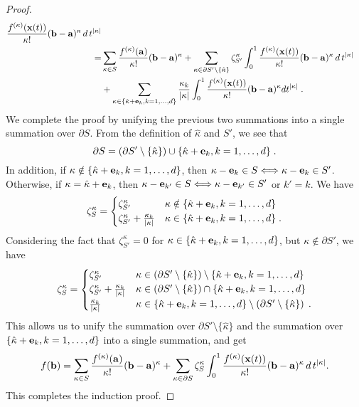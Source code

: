 \begin{proof}
\[\begin{split}
        \frac{f^{(\kappa)}(\mathbf{x}(t))}{\kappa!} (\mathbf{b}-\mathbf{a})^\kappa \,d\,t^{|\kappa|} \\
      =& \sum_{\kappa\in S} \frac{f^{(\kappa)}(\mathbf{a})}{\kappa!} (\mathbf{b}-\mathbf{a})^\kappa
      + \sum_{\kappa\in \partial S' \setminus \{{\hat\kappa}\}}
        \zeta^\kappa_{S'} \int_0^1
        \frac{f^{(\kappa)}(\mathbf{x}(t))}{\kappa!} (\mathbf{b}-\mathbf{a})^\kappa \,d\,t^{|\kappa|} \\
     &+ \sum_{\kappa\in \{{\hat\kappa}+\mathbf{e}_k,k=1,\ldots,d\}}
        \frac{\kappa_k}{|\kappa|} \int_0^1
        \frac{f^{(\kappa)}(\mathbf{x}(t))} {\kappa!} (\mathbf{b}-\mathbf{a})^{\kappa} dt^{|\kappa|}\;.
\end{split}\]
We complete the proof by unifying the previous two summations into
a single summation over $\partial S$.
From the definition of $\hat\kappa$ and $S'$, we see that
\[ \partial S = \left( \partial S' \setminus \{\hat\kappa\} \right)
                \cup \{ {\hat\kappa}+\mathbf{e}_k, k=1,\ldots,d \} \;.\]
In addition, if $\kappa \notin \{ {\hat\kappa}+\mathbf{e}_k, k=1,\ldots,d \}$, then
$\kappa-\mathbf{e}_k\in S \Longleftrightarrow \kappa-\mathbf{e}_k\in S'$.
Otherwise, if $\kappa = {\hat\kappa}+\mathbf{e}_k$,
then $\kappa-\mathbf{e}_{k'}\in S \Longleftrightarrow \kappa-\mathbf{e}_{k'}\in S'$ or $k'=k$.
We have
\[ \zeta^\kappa_S = \begin{cases}
   \zeta^\kappa_{S'} & \kappa \notin \{ {\hat\kappa}+\mathbf{e}_k, k=1,\ldots,d \} \\
   \zeta^\kappa_{S'} + \frac{\kappa_k}{|\kappa|} &
                      \kappa \in \{ {\hat\kappa}+\mathbf{e}_k, k=1,\ldots,d \} \;.
   \end{cases}\]
Considering the fact that $\zeta^\kappa_{S'} = 0$ for
$\kappa \in \{ {\hat\kappa}+\mathbf{e}_k, k=1,\ldots,d \}$, but
$\kappa \notin \partial S'$, we have
\[ \zeta^\kappa_S = \begin{cases}
   \zeta^\kappa_{S'} &
       \kappa \in \left( \partial S' \setminus \{\hat\kappa\} \right)
       \setminus \{ {\hat\kappa}+\mathbf{e}_k, k=1,\ldots,d \} \\
   \zeta^\kappa_{S'} + \frac{\kappa_k}{|\kappa|} &
       \kappa \in \left( \partial S' \setminus \{\hat\kappa\} \right)
       \cap \{ {\hat\kappa}+\mathbf{e}_k, k=1,\ldots,d \} \\
   \frac{\kappa_k}{|\kappa|} &
       \kappa \in \{ {\hat\kappa}+\mathbf{e}_k, k=1,\ldots,d \} \setminus
       \left( \partial S' \setminus \{\hat\kappa\} \right) \;.
   \end{cases}\]
This allows us to unify the summation over
$\partial S' \setminus \{\hat\kappa\}$ and the summation over
$\{ {\hat\kappa}+\mathbf{e}_k, k=1,\ldots,d \}$ into a single summation, and get
\[ f(\mathbf{b}) = \sum_{\kappa\in S} \frac{f^{(\kappa)}(\mathbf{a})}{\kappa!} (\mathbf{b}-\mathbf{a})^\kappa
      + \sum_{\kappa\in \partial S}
        \zeta^\kappa_S \int_0^1
        \frac{f^{(\kappa)}(\mathbf{x}(t))}{\kappa!} (\mathbf{b}-\mathbf{a})^\kappa \,d\,t^{|\kappa|}. \]
This completes the induction proof.
\end{proof}
